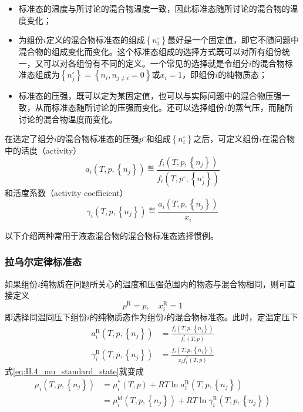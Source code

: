 \documentclass[main.tex]{subfiles}
\begin{document}
\begin{itemize}
    \item 标准态的温度与所讨论的混合物温度一致，因此标准态随所讨论的混合物的温度变化；
    \item 为组份$i$定义的混合物标准态的组成$\left\{n_i^\circ\right\}$最好是一个固定值，即它不随问题中混合物的组成变化而变化。这个标准态组成的选择方式既可以对所有组份统一，又可以对各组份有不同的定义。一个常见的选择就是令组分$i$的混合物标准态组成为$\left\{n_j^\circ\right\}=\left\{n_i,n_{j\neq i}=0\right\}$或$x_i=1$，即组份$i$的纯物质态；
    \item 标准态的压强，既可以定为某固定值，也可以与实际问题中的混合物压强一致，从而标准态随所讨论的压强而变化。还可以选择组份$i$的蒸气压，而随所讨论的混合物温度而变化。
\end{itemize}

在选定了组分$i$的混合物标准态的压强$p^\circ$和组成$\left\{n_i^\circ\right\}$之后，可定义组份$i$在混合物中的活度（activity）
\[a_i\left(T,p,\left\{n_j\right\}\right)\eqdef\frac{f_i\left(T,p,\left\{n_j\right\}\right)}{f_i\left(T,p^\circ,\left\{n_j^\circ\right\}\right)}\]
和活度系数（activity coefficient）
\[\gamma_i\left(T,p,\left\{n_j\right\}\right)\eqdef\frac{a_i\left(T,p,\left\{n_j\right\}\right)}{x_i}\]

以下介绍两种常用于液态混合物的混合物标准态选择惯例。

\subsubsection{拉乌尔定律标准态}
如果组份$i$纯物质在问题所关心的温度和压强范围内的物态与混合物相同，则可直接定义
\[p^\text{R}=p,\quad x^\text{R}_i=1\]
即选择同温同压下组份$i$的纯物质态作为组份$i$的混合物标准态。此时，定温定压下
\begin{align*}
    a_i^\text{R}\left(T,p,\left\{n_j\right\}\right)      & =\frac{f_i\left(T,p,\left\{n_j\right\}\right)}{f_i^*\left(T,p\right)}    \\
    \gamma_i^\text{R}\left(T,p,\left\{n_j\right\}\right) & =\frac{f_i\left(T,p,\left\{n_j\right\}\right)}{x_if_i^*\left(T,p\right)}
\end{align*}
式\eqref{eq:II.4_mu_standard_state}就变成
\begin{align*}
    \mu_i\left(T,p,\left\{n_j\right\}\right) & =\mu_i^*\left(T,p\right)+RT\ln a_i^\text{R}\left(T,p,\left\{n_j\right\}\right)                                \\
                                             & =\mu_i^\text{id}\left(T,p,\left\{n_j\right\}\right)+RT\ln\gamma_i^\text{R}\left(T,p,\left\{n_j\right\}\right)
\end{align*}
\end{document}
